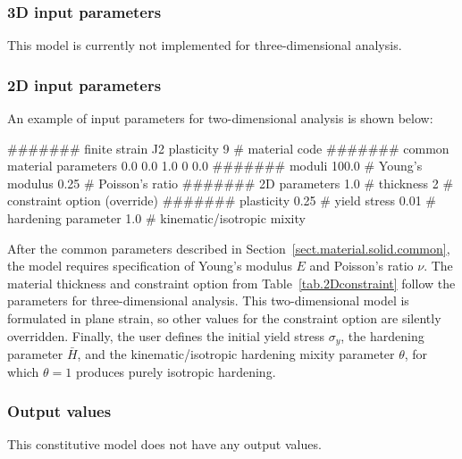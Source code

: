 \subsubsection{3D input parameters}
This model is currently not implemented for three-dimensional analysis.

\subsubsection{2D input parameters}
An example of input parameters for two-dimensional analysis is shown 
below:
\begin{inputfile}
####### finite strain J2 plasticity
9     # material code
####### common material parameters
0.0    0.0    1.0
0      0.0
####### moduli
100.0 # Young's modulus
0.25  # Poisson's ratio
####### 2D parameters
1.0   # thickness
2     # constraint option (override)
####### plasticity
0.25  # yield stress
0.01  # hardening parameter
1.0   # kinematic/isotropic mixity
\end{inputfile}
After the common parameters described in 
Section~\ref{sect.material.solid.common}, the 
model requires specification of Young's modulus 
$E$ and Poisson's ratio $\nu$. 
The material thickness and 
constraint option from Table~\ref{tab.2Dconstraint} 
follow the parameters for three-dimensional analysis.
This two-dimensional model is formulated in plane strain,
so other values for the constraint option are silently
overridden.
Finally, the user defines the initial 
yield stress $\sigma_{y}$, the hardening parameter $\bar{H}$, and the 
kinematic/isotropic hardening mixity parameter $\theta$, 
for which $\theta = 1$ produces purely isotropic hardening.

\subsubsection{Output values}
This constitutive model does not have any output values.

